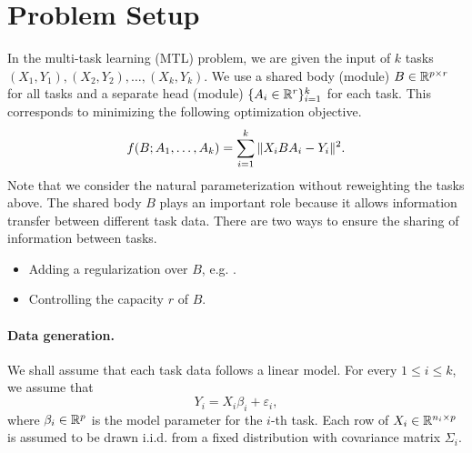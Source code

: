 \section{Problem Setup}\label{sec_setup}

In the multi-task learning (MTL) problem, we are given the input of $k$ tasks $(X_1, Y_1), (X_2, Y_2), \dots, (X_k, Y_k)$.
We use a shared body (module) $B\in\mathbb{R}^{p\times r}$ for all tasks and a separate head (module) $\{A_i \in \mathbb{R}^{r}\}_{i=1}^k$ for each task.
This corresponds to minimizing the following optimization objective.
\begin{align}
	\label{eq_mtl}
	f(B; A_1, \dots, A_k) = \sum_{i=1}^k \|X_i B A_i - Y_i\|^2.
\end{align}
Note that we consider the natural parameterization without reweighting the tasks above.
The shared body $B$ plays an important role because it allows information transfer between different task data.
There are two ways to ensure the sharing of information between tasks.
\begin{itemize}
	\item Adding a regularization over $B$, e.g. \cite{LPTV09,LPVT11}.
	\item Controlling the capacity $r$ of $B$.
\end{itemize}


\paragraph{Data generation.} We shall assume that each task data follows a linear model.
For every $1\le i\le k$, we assume that
\[ Y_i = X_i \beta_i + \varepsilon_i, \]
where $\beta_i\in\mathbb{R}^p$ is the model parameter for the $i$-th task.
Each row of $X_i\in\mathbb{R}^{n_i\times p}$ is assumed to be drawn i.i.d. from a fixed distribution with covariance matrix $\Sigma_i$.



